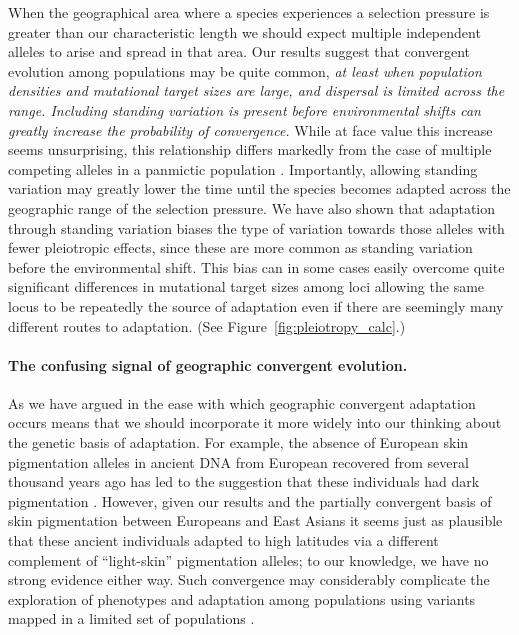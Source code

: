 \documentclass{article}
\newcommand{\gc}[1]{{\it\color{blue} #1} }
\begin{document}
When the geographical area where a species experiences a 
selection pressure is greater than our characteristic
length we should expect multiple independent alleles to arise and
spread in that area. Our results suggest that convergent evolution
among populations may be quite common, \gc{at least when population
  densities and mutational target sizes are large, and dispersal is
  limited across the range.  Including standing variation is present
before environmental shifts can greatly increase the probability of convergence. }
While at face value this increase seems unsurprising,
this relationship differs markedly from the case of multiple competing
alleles in a panmictic population \citep[see discussion above and in ][]{softsweepsI,softsweepsII}. 
Importantly, allowing standing variation may greatly lower the time until the species becomes adapted 
across the geographic range of the selection pressure. We have also
shown that adaptation through standing variation biases the type of variation towards those alleles 
with fewer pleiotropic effects, since these are more common as standing variation before the environmental shift. 
This bias can in some cases easily overcome quite significant differences in mutational target sizes
among loci allowing the same locus to be repeatedly the source of
adaptation even if there are seemingly many different routes to adaptation.
(See Figure~\ref{fig:pleiotropy_calc}.)

\paragraph{The confusing signal of geographic convergent evolution.}
As we have argued in \citet{ralphcoop2010} the ease with which
geographic convergent adaptation occurs means that we should
incorporate it more widely into our thinking about the genetic basis
of adaptation. For example, the absence of European skin pigmentation alleles in
ancient DNA from European recovered from several thousand years ago
has led to the suggestion that these individuals had dark
pigmentation \citep{olalde2014derived,lazaridis2013ancient, Wilde2014}. 
However, given our results and the partially convergent
basis of skin pigmentation between Europeans and East Asians
\citep{norton-human-pigmentation,edwards2010pigmentation} it seems just as plausible that these ancient individuals
adapted to high latitudes via a different complement of ``light-skin'' pigmentation alleles;
to our knowledge, we have no strong evidence either way.
Such convergence may considerably complicate the 
exploration of phenotypes and adaptation among populations using variants mapped in a
limited set of populations \citep{Berg:14}.
\end{document}
